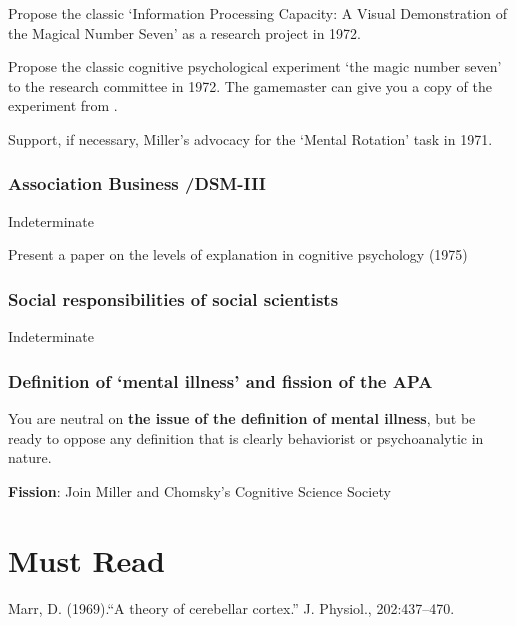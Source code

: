 \begin{refsection}
\begin{researchtask}[Marr]\label{researchtask:marr}

Propose the classic ‘Information Processing Capacity: A Visual Demonstration of the Magical Number Seven’ as a research project in 1972.
\end{researchtask}
Propose the classic cognitive psychological experiment ‘the magic number seven’ to the research committee in 1972. The gamemaster can give you a copy of the experiment from .

Support, if necessary, Miller’s advocacy for the ‘Mental Rotation’ task in 1971.

\subsubsection{Association Business \slash  DSM-III}
\label{associationbusinessdsm-iii}

Indeterminate
\begin{writingtask}[Marr]\label{writingtask:marr}
Present a paper on the levels of explanation in cognitive psychology (1975)
\end{writingtask}

\subsubsection{Social responsibilities of social scientists}
\label{socialresponsibilitiesofsocialscientists}

Indeterminate

\subsubsection{Definition of ‘mental illness’ and fission of the APA}
\label{definitionof‘mentalillness’andfissionoftheapa}

You are neutral on \textbf{the issue of the definition of mental illness}, but be ready to oppose any definition that is clearly behaviorist or psychoanalytic in nature.

\textbf{Fission}: Join Miller and Chomsky's Cognitive Science Society

\section{Must Read}
\label{mustread}

Marr, D. (1969).“A theory of cerebellar cortex.” J. Physiol., 202:437--470.


\end{refsection}
